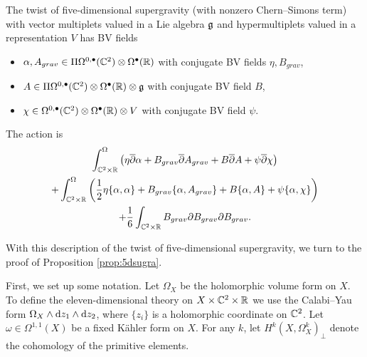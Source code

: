 \begin{conj}
\label{conj:5dsugra}
The twist of five-dimensional supergravity (with nonzero Chern--Simons term) with vector multiplets valued in a Lie algebra $\mathfrak g$ and hypermultiplets valued in a representation $V$ has BV fields
\begin{itemize}
\item $\alpha, A_{grav} \in \Pi \Omega^{0,\bullet}(\mathbb C^2) \otimes \Omega^\bullet(\mathbb R)$ with conjugate BV fields $\eta, B_{grav}$,
\item $A \in \Pi \Omega^{0,\bullet}(\mathbb C^2) \otimes \Omega^\bullet(\mathbb R) \otimes \mathfrak g$ with conjugate BV field $B$,
\item $\chi \in \Omega^{0,\bullet}(\mathbb C^2) \otimes \Omega^\bullet(\mathbb R) \otimes V$ with conjugate BV field $\psi$.
\end{itemize}

The action is
\begin{multline}
\label{eqn:5daction} 
\int^\Omega_{\mathbb C^2 \times \mathbb R} \left(\eta \overline{\partial} \alpha + B_{grav} \overline{\partial} A_{grav} + B \overline{\partial} A + \psi \overline{\partial} \chi \right) \\
  + \int^\Omega_{\mathbb C^2 \times \mathbb R} \left( \frac12\eta \{\alpha, \alpha\} +  B_{grav} \{\alpha, A_{grav}\}+ B \{\alpha, A\} +  \psi \{\alpha, \chi \}\right) \\ 
+ \frac16 \int_{\mathbb C^2 \times \mathbb R} B_{grav} \partial B_{grav} \partial B_{grav} .
\end{multline}
\end{conj}


\parsec[-]

With this description of the twist of five-dimensional supergravity, we turn to the proof of Proposition \ref{prop:5dsugra}. 


First, we set up some notation. 
Let $\Omega_X$ be the holomorphic volume form on $X$. 
To define the eleven-dimensional theory on $X \times \mathbb C^2 \times \mathbb R$ we use the Calabi--Yau form $\Omega_X \wedge {\rm d} z_1 \wedge {\rm d} z_2$, where $\{z_i\}$ is a holomorphic coordinate on $\mathbb C^2$. 
Let $\omega \in \Omega^{1,1}(X)$ be a fixed K\"ahler form on $X$.
For any $k$, let $H^k(X, \Omega^k_X)_\perp$ denote the cohomology of the primitive elements. 

